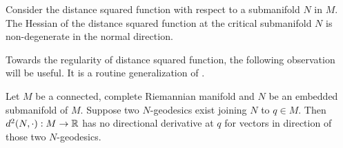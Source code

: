 \begin{cor}\label{dsq-MB}
    Consider the distance squared function with respect to a submanifold $N$ in $M$. The Hessian of the distance squared function at the critical submanifold $N$ is non-degenerate in the normal direction. 
\end{cor}

\vspace{0.3cm}
\hf Towards the regularity of distance squared function, the following observation will be useful. It is a routine generalization of \cite[Lemma~1]{Wol79}.

\begin{lemma}\cite[Lemma 3.7]{BaPr21} \label{Lmm: singdsq}
    Let $M$ be a connected, complete Riemannian manifold and $N$ be an embedded submanifold of $M$. Suppose two $N$-geodesics exist joining $N$ to $q\in M$. Then $d^2(N,\cdot):M\to \mathbb{R}$ has no directional derivative at $q$ for vectors in direction of those two $N$-geodesics. 
\end{lemma}
